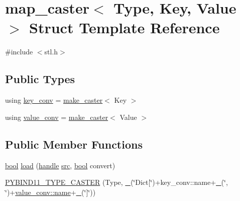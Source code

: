 \hypertarget{structmap__caster}{}\section{map\+\_\+caster$<$ Type, Key, Value $>$ Struct Template Reference}
\label{structmap__caster}


{\ttfamily \#include $<$stl.\+h$>$}

\subsection*{Public Types}
\begin{DoxyCompactItemize}
\item 
using \mbox{\hyperlink{structmap__caster_aec5f554ce2ec2e021aa59de6dd3c6cbc}{key\+\_\+conv}} = \mbox{\hyperlink{cast_8h_ab32b52411a6b07420516d79074815713}{make\+\_\+caster}}$<$ Key $>$
\item 
using \mbox{\hyperlink{structmap__caster_a3deb01883f8f6ea4a885047f5335fa87}{value\+\_\+conv}} = \mbox{\hyperlink{cast_8h_ab32b52411a6b07420516d79074815713}{make\+\_\+caster}}$<$ Value $>$
\end{DoxyCompactItemize}
\subsection*{Public Member Functions}
\begin{DoxyCompactItemize}
\item 
\mbox{\hyperlink{asdl_8h_af6a258d8f3ee5206d682d799316314b1}{bool}} \mbox{\hyperlink{structmap__caster_aa35d07c2fcaf64c021da0bff1f710992}{load}} (\mbox{\hyperlink{classhandle}{handle}} \mbox{\hyperlink{_s_d_l__opengl__glext_8h_a72e0fdf0f845ded60b1fada9e9195cd7}{src}}, \mbox{\hyperlink{asdl_8h_af6a258d8f3ee5206d682d799316314b1}{bool}} convert)
\item 
\mbox{\hyperlink{structmap__caster_a2aec5030fb62b7cdd6a201b15b322a79}{P\+Y\+B\+I\+N\+D11\+\_\+\+T\+Y\+P\+E\+\_\+\+C\+A\+S\+T\+ER}} (Type, \mbox{\hyperlink{descr_8h_af114703e20c6527e87163eb2798f74b8}{\+\_\+}}(\char`\"{}Dict\mbox{[}\char`\"{})+key\+\_\+conv\+::name+\mbox{\hyperlink{descr_8h_af114703e20c6527e87163eb2798f74b8}{\+\_\+}}(\char`\"{}, \char`\"{})+\mbox{\hyperlink{classtype__caster__base_a1287a0b427306b31949df84e062373ba}{value\+\_\+conv\+::name}}+\mbox{\hyperlink{descr_8h_af114703e20c6527e87163eb2798f74b8}{\+\_\+}}(\char`\"{}\mbox{]}\char`\"{}))
\end{DoxyCompactItemize}

